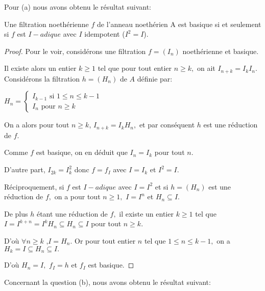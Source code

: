 Pour (a) nous avons obtenu le résultat suivant:
\begin{maproposition}
	Une filtration noethérienne $f $ de l'anneau noethérien A est
	basique si et seulement si $f$ est $I-adique$ avec $I$ idempotent ($I^{2}=I$).
\end{maproposition}
\begin{proof}
	Pour le voir, considérons une filtration $f=(I_{n})$ noethérienne et
	basique. 
	
	Il existe alors un entier $k\geq 1$ tel que pour tout entier $n\geq k,$ on
	ait $I_{n+k}=I_{k}I_{n}.$ Considérons la filtration $h=(H_{n})$ de $A$ définie par:
	
	$H_{n}=\left\{ 
	\begin{array}{c}
		I_{k-1}\text{ si }1\leq n\leq k-1 \\ 
		I_{n}\text{ pour }n\geq k%
	\end{array}%
	\right. $ 
	
	On a alors pour tout $n\geq k$, $I_{n+k}=I_{k}H_{n},$ et par conséquent $h$ est une réduction de $f.$
	
	Comme $f$ est basique, on en déduit que $I_{n}=I_{k}$ pour tout $n.$
	
	D'autre part, $I_{2k}=I_{k}^{2}$ donc $f=f_{I}$ avec $I=I_{k}$ et $I^{2}=I.$
	
	Réciproquement, si $f$ est $I-adique$ avec $I=I^{2}$ et si $h=(H_{n})$
	est une réduction de $f,$ on a pour tout $n\geq 1,$ $I=I^{n}$ et $%
	H_{n}\subseteq I.$
	
	De plus $h$ étant une réduction de $f,$ il existe un entier $k\geq 1$
	tel que $I=I^{k+n}=I^{k}H_{n}\subseteq H_{n}\subseteq I$ pour tout $n\geq k.$
	
	D'où $\forall n\geq k$ ,$I=H_{n}.$ Or pour tout entier $n$ tel que $1\leq n\leq k-1,$ on a $H_{k}=I\subseteq H_{n}\subseteq I.$
	
	D'où $H_{n}=I,$ $f_{I}=h$ et $f_{I}$ est basique.
\end{proof}

Concernant la question (b), nous avons obtenu le résultat suivant:

